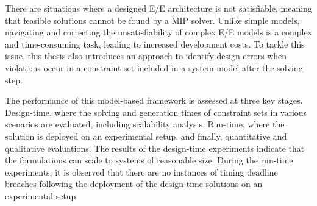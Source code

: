     
    
    There are situations where a designed E/E architecture is not satisfiable, meaning that feasible solutions cannot be found by a MIP solver. Unlike simple models, navigating and correcting the unsatisfiability of complex E/E models is a complex and time-consuming task, leading to increased development costs. To tackle this issue, this thesis also introduces an approach to identify design errors when violations occur in a constraint set included in a system model after the solving step. %
    
     The performance of this model-based framework is assessed at three key stages. Design-time, where the solving and generation times of constraint sets in various scenarios are evaluated, including scalability analysis. Run-time, where the solution is deployed on an experimental setup, and finally, quantitative and qualitative evaluations. The results of the design-time experiments indicate that the formulations can scale to systems of reasonable size. During the run-time experiments, it is observed that there are no instances of timing deadline breaches following the deployment of the design-time solutions on an experimental setup.
     
